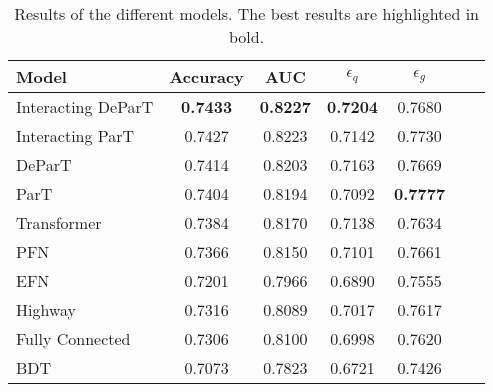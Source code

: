\begin{table}[!htb]
    \centering
    \caption{Results of the different models. The best results are highlighted in bold.}
    \label{tab:results}
    \begin{tabular}{lcccccc}
    \toprule
        Model & Accuracy & AUC & $\epsilon_q$ & $\epsilon_g$ \\
    \midrule
        Interacting DeParT & \textbf{0.7433} & \textbf{0.8227} & \textbf{0.7204} & 0.7680 \\
        Interacting ParT & 0.7427 & 0.8223 & 0.7142 & 0.7730 \\
        DeParT & 0.7414 & 0.8203 & 0.7163 & 0.7669 \\
        ParT & 0.7404 & 0.8194 & 0.7092 & \textbf{0.7777} \\
        Transformer & 0.7384 & 0.8170 & 0.7138 & 0.7634 \\
        PFN & 0.7366 & 0.8150 & 0.7101 & 0.7661 \\
        EFN & 0.7201 & 0.7966 & 0.6890 & 0.7555 \\
        Highway & 0.7316 & 0.8089 & 0.7017 & 0.7617 \\
        Fully Connected & 0.7306 & 0.8100 & 0.6998 & 0.7620 \\
        BDT & 0.7073 & 0.7823 & 0.6721 & 0.7426 \\
    \bottomrule
    \end{tabular}
\end{table}
    